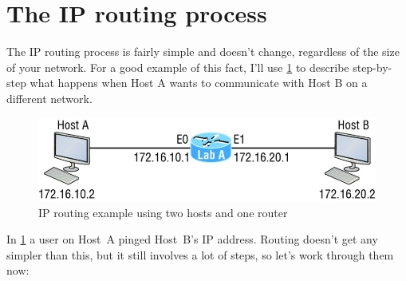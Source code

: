 \section{The IP routing process}

The IP routing process is fairly simple and doesn't change, regardless of the size of your network.
For a good example of this fact, I'll use \cref{fig:ip-routing-example} to describe step-by-step what happens when Host A wants to communicate with Host B on a different network.


\begin{figure}
   \centering
   \includegraphics{images/c09f002.jpg}
   \caption{IP routing example using two hosts and one router}
   \label{fig:ip-routing-example}
\end{figure}

In \cref{fig:ip-routing-example} a user on Host~A pinged Host~B's IP address.
Routing doesn't get any simpler than this, but it still involves a lot of steps, so let's work through them now:

